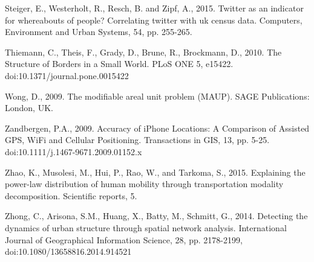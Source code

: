 \documentclass[]{tGIS2e}
\begin{document}
\begin{thebibliography}{9}
Steiger, E., Westerholt, R., Resch, B. and Zipf, A., 2015. Twitter as an indicator for whereabouts of people? Correlating twitter with uk census data. Computers, Environment and Urban Systems, 54, pp. 255-265.


Thiemann, C., Theis, F., Grady, D., Brune, R., Brockmann, D., 2010. The Structure of Borders in a Small World. PLoS ONE 5, e15422. doi:10.1371/journal.pone.0015422

Wong, D., 2009. The modifiable areal unit problem (MAUP). SAGE Publications: London, UK.

Zandbergen, P.A., 2009. Accuracy of iPhone Locations: A Comparison of Assisted GPS, WiFi and Cellular Positioning. Transactions in GIS, 13, pp. 5-25. doi:10.1111/j.1467-9671.2009.01152.x

Zhao, K., Musolesi, M., Hui, P., Rao, W., and Tarkoma, S., 2015. Explaining the power-law distribution of human mobility through transportation modality decomposition. Scientific reports, 5.

Zhong, C., Arisona, S.M., Huang, X., Batty, M., Schmitt, G., 2014. Detecting the dynamics of urban structure through spatial network analysis. International Journal of Geographical Information Science, 28, pp. 2178-2199, doi:10.1080/13658816.2014.914521

\end{thebibliography}


%




\label{lastpage}
\end{document}
